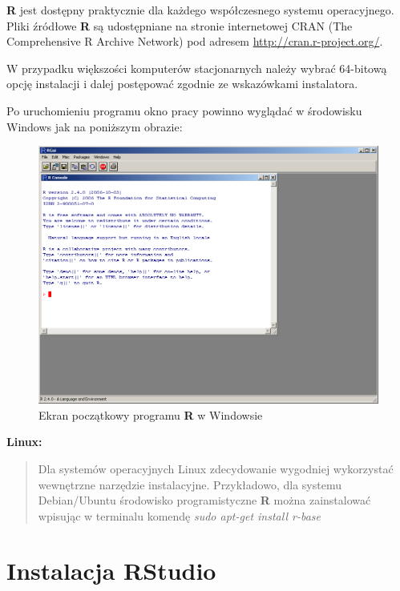\documentclass[]{book}
\theoremstyle{definition}
\theoremstyle{definition}
\theoremstyle{definition}
\theoremstyle{remark}
\begin{document}
\textbf{R} jest dostępny praktycznie dla każdego współczesnego systemu
operacyjnego. Pliki źródłowe \textbf{R} są udostępniane na stronie
internetowej CRAN (The Comprehensive R Archive Network) pod adresem
\url{http://cran.r-project.org/}.

W przypadku większości komputerów stacjonarnych należy wybrać 64-bitową
opcję instalacji i dalej postępować zgodnie ze wskazówkami instalatora.

Po uruchomieniu programu okno pracy powinno wyglądać w środowisku
Windows jak na poniższym obrazie:

\begin{figure}
\centering
\includegraphics{figures/r_windows.png}
\caption{Ekran początkowy programu \textbf{R} w Windowsie}
\end{figure}

\textbf{Linux:}

\begin{quote}
Dla systemów operacyjnych Linux zdecydowanie wygodniej wykorzystać
wewnętrzne narzędzie instalacyjne. Przykładowo, dla systemu
Debian/Ubuntu środowisko programistyczne \textbf{R} można zainstalować
wpisując w terminalu komendę \emph{sudo apt-get install r-base}
\end{quote}

\section*{\texorpdfstring{Instalacja
\textbf{RStudio}}{Instalacja RStudio}}\label{instalacja-rstudio}
\end{document}

